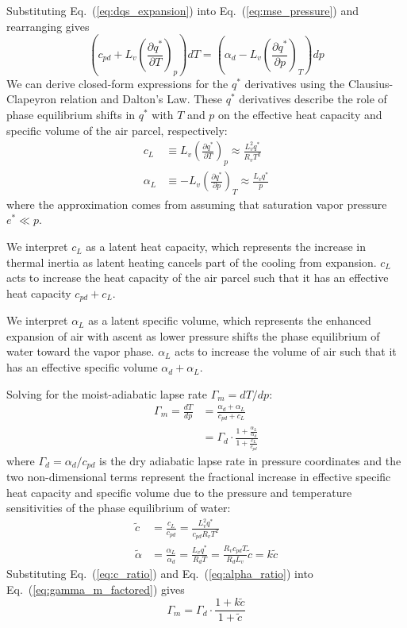 \documentclass[draft]{ametsocV6.1}
\begin{document}
Substituting Eq.~(\ref{eq:dqs_expansion}) into Eq.~(\ref{eq:mse_pressure}) and rearranging gives
\begin{equation}
\left(c_{pd} + L_v\left(\frac{\partial q^*}{\partial T}\right)_p \right)dT = \left(\alpha_d - L_v\left(\frac{\partial q^*}{\partial p}\right)_T\right)dp \label{eq:rearranged}
\end{equation}
We can derive closed-form expressions for the $q^*$ derivatives using the Clausius-Clapeyron relation and Dalton's Law. These $q^*$ derivatives describe the role of phase equilibrium shifts in $q^*$ with $T$ and $p$ on the effective heat capacity and specific volume of the air parcel, respectively:
\begin{align}
c_L &\equiv L_v\left(\frac{\partial q^*}{\partial T}\right)_p \approx \frac{L_v^2 q^*}{R_v T^2}
\label{eq:c_L} \\
\alpha_L &\equiv -L_v\left(\frac{\partial q^*}{\partial p}\right)_T \approx \frac{L_v q^*}{p}
\label{eq:alpha_L}
\end{align}
where the approximation comes from assuming that saturation vapor pressure $e^* \ll p$.

We interpret $c_L$ as a latent heat capacity, which represents the increase in thermal inertia as latent heating cancels part of the cooling from expansion. $c_L$ acts to increase the heat capacity of the air parcel such that it has an effective heat capacity $c_{pd} + c_L$.

We interpret $\alpha_L$ as a latent specific volume, which represents the enhanced expansion of air with ascent as lower pressure shifts the phase equilibrium of water toward the vapor phase. $\alpha_L$ acts to increase the volume of air such that it has an effective specific volume $\alpha_d + \alpha_L$.

Solving for the moist-adiabatic lapse rate $\Gamma_m = dT/dp$:
\begin{align}
\Gamma_m = \frac{dT}{dp} &= \frac{\alpha_d +\alpha_L}{c_{pd} + c_L} \label{eq:gamma_m_ratio} \\
&= \Gamma_d \cdot \frac{1+\frac{\alpha_L}{\alpha_d}}{1+\frac{c_L}{c_{pd}}} \label{eq:gamma_m_factored}
\end{align}
where $\Gamma_d = \alpha_d / c_{pd}$ is the dry adiabatic lapse rate in pressure coordinates and the two non-dimensional terms represent the fractional increase in effective specific heat capacity and specific volume due to the pressure and temperature sensitivities of the phase equilibrium of water:
\begin{align}
\tilde{c} &= \frac{c_L}{c_{pd}} = \frac{L_v^2 q^*}{c_{pd} R_v T^2} \label{eq:c_ratio} \\
\tilde{\alpha} &= \frac{\alpha_L}{\alpha_d} = \frac{L_v q^*}{R_d T} = \frac{R_v c_{pd}T}{R_dL_v}\tilde{c} = k\tilde{c} \label{eq:alpha_ratio}
\end{align}
Substituting Eq.~(\ref{eq:c_ratio}) and Eq.~(\ref{eq:alpha_ratio}) into Eq.~(\ref{eq:gamma_m_factored}) gives
\begin{equation}
\Gamma_m = \Gamma_d \cdot \frac{1 + k\tilde{c}}{1 + \tilde{c}} \label{eq:gamma_m_tilde}
\end{equation}
\end{document}
